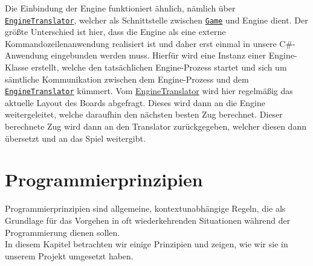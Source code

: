 \documentclass[
10pt, %
a4paper, %
oneside, %
headinclude,footinclude, %
BCOR5mm, %
]{scrartcl}
\begin{document}
\begin{onehalfspace}
Die Einbindung der Engine funktioniert ähnlich, nämlich über \texttt{\href{https://github.com/schmida736/Chess-AdvancedSE/blob/main/Chess-AdvancedSE/Translators/EngineTranslator.cs}{EngineTranslator}}, welcher als Schnittstelle zwischen \texttt{\href{https://github.com/schmida736/Chess-AdvancedSE/blob/main/Chess-AdvancedSE/Game\%20Elements/Game.cs}{Game}} und Engine dient. Der größte Unterschied ist hier, dass die Engine als eine externe Kommandozeilenanwendung realisiert ist und daher erst einmal in unsere C\#-Anwendung eingebunden werden muss.
Hierfür wird eine Instanz einer Engine-Klasse erstellt, welche den tatsächlichen Engine-Prozess startet und sich um sämtliche Kommunikation zwischen dem Engine-Prozess und dem \texttt{\href{https://github.com/schmida736/Chess-AdvancedSE/blob/main/Chess-AdvancedSE/Translators/EngineTranslator.cs}{EngineTranslator}} kümmert. Vom \href{https://github.com/schmida736/Chess-AdvancedSE/blob/main/Chess-AdvancedSE/Translators/EngineTranslator.cs}{EngineTranslator} wird hier regelmäßig das aktuelle Layout des Boards abgefragt. Dieses wird dann an die Engine weitergeleitet, welche daraufhin den nächsten besten Zug berechnet. Dieser berechnete Zug wird dann an den Translator zurückgegeben, welcher diesen dann übersetzt und an das Spiel weitergibt.
\newpage
\section{Programmierprinzipien}
Programmierprinzipien sind allgemeine, kontextunabhängige Regeln, die als Grundlage für das Vorgehen in oft wiederkehrenden Situationen während der Programmierung dienen sollen.\\
In diesem Kapitel betrachten wir einige Prinzipien und zeigen, wie wir sie in unserem Projekt umgesetzt haben.

\end{onehalfspace}
\end{document}
